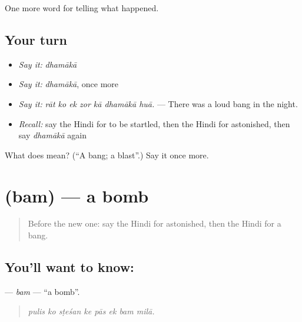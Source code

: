 \begin{grammarlens}[title={What you've built}]
One more word for telling what happened.
\end{grammarlens}

\subsection*{Your turn}
\begin{itemize}
\raggedright
  \item \emph{Say it:} \emph{dhamākā}
  \item \emph{Say it:} \emph{dhamākā}, once more
  \item \emph{Say it:} \emph{rāt ko ek zor kā dhamākā huā.} — There was a loud bang in the night.
  \item \emph{Recall:} say the Hindi for to be startled, then the Hindi for astonished, then say \emph{dhamākā} again
\end{itemize}

\begin{tcolorbox}[breakable,colback=teal!4,colframe=teal!35!black,title={Before you move on}]
What does  mean? (\textquotedblleft{}A bang; a blast\textquotedblright{}.) Say it once more.
\end{tcolorbox}
\section[\texorpdfstring{\hi{बम} (bam)}{बम (bam)}]{ (bam) — a bomb}

\label{lesson:HI-C318-bam}



\begin{quote}
Before the new one: say the Hindi for astonished, then the Hindi for a bang.
\end{quote}

\subsection*{You'll want to know: }
\textbf{} — \emph{bam} — \textquotedblleft{}a bomb\textquotedblright{}.

\begin{quote}
       
\end{quote}

\begin{quote}
\emph{pulis ko sṭeśan ke pās ek bam milā.}
\end{quote}

